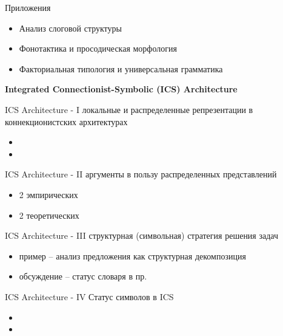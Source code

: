 \documentclass{beamer}
\begin{document}
\begin{frame}{Приложения}
\begin{itemize}
	\item Анализ слоговой структуры
	\medskip
	\item Фонотактика и просодическая морфология
	\medskip
	\item Факториальная типология и универсальная грамматика
\end{itemize}
\end{frame}


\begin{frame}{}
\begin{center}
	\textbf{Integrated Connectionist-Symbolic (ICS) Architecture}
\end{center}
\end{frame}

\iffalse

\begin{frame}{ICS Architecture - I}
локальные и распределенные репрезентации в коннекционистских архитектурах
\bigskip
\begin{itemize}
	\item 
	\medskip
	\item 
\end{itemize}
\end{frame}

\begin{frame}{ICS Architecture - II}
аргументы в пользу распределенных представлений
\bigskip
\begin{itemize}
	\item 2 эмпирических
	\medskip
	\item 2 теоретических
\end{itemize}
\end{frame}

\begin{frame}{ICS Architecture - III}
структурная (символьная) стратегия решения задач
\bigskip
\begin{itemize}
	\item пример -- анализ предложения как структурная декомпозиция
	\medskip
	\item обсуждение -- статус словаря в пр.
\end{itemize}
\end{frame}

\begin{frame}{ICS Architecture - IV}
Статус символов в ICS
\bigskip
\begin{itemize}
	\item 
	\medskip
	\item 
\end{itemize}
\end{frame}
\end{document}
